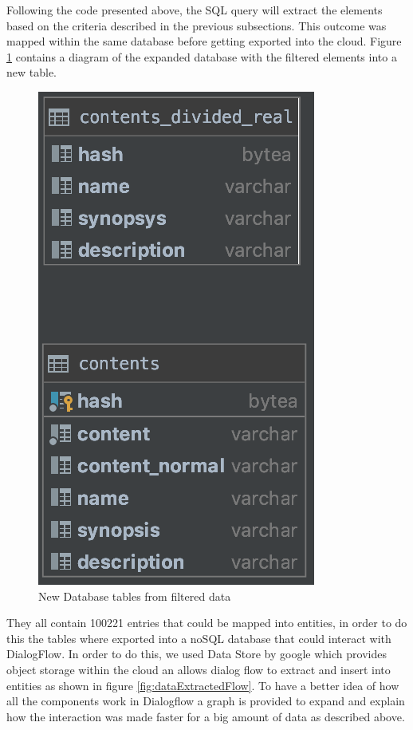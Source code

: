 Following the code presented above, the SQL query will extract the elements based on the criteria described in the previous subsections. This outcome was mapped within the same database before getting exported into the cloud. Figure \ref{fig:manned_edited} contains a diagram of the expanded database with the filtered elements into a new table.

\begin{figure}[!ht]
    \centering
    \includegraphics[scale=0.70]{MA-BA-Thesis/NewStructure.png}
    \caption{New Database tables from filtered data}
    \label{fig:manned_edited}
\end{figure}
They all contain 100221 entries that could be mapped into entities, in order to do this the tables where exported into a noSQL database that could interact with DialogFlow. In order to do this, we used Data Store by google which provides object storage within the cloud an allows dialog flow to extract and insert into entities as shown in figure \ref{fig:dataExtractedFlow}. To have a better idea of how all the components work in Dialogflow a graph is provided to expand and explain how the interaction was made faster for a big amount of data as described above.

